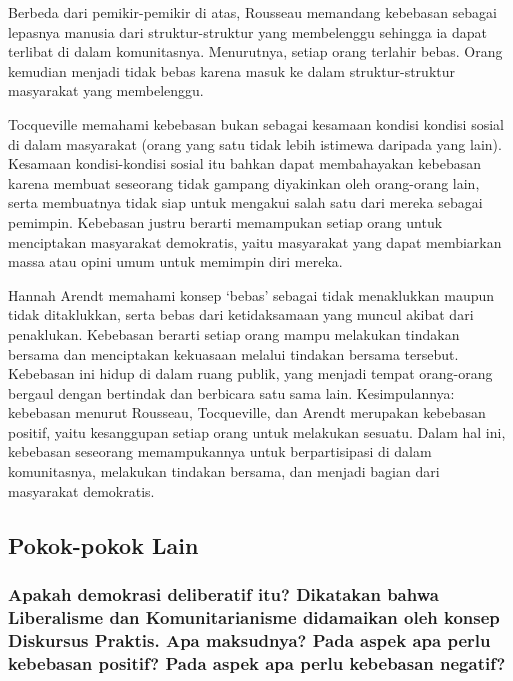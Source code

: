 \documentclass[11pt,twoside,a5paper,openany]{memoir}
\begin{document}
Berbeda dari pemikir-pemikir di atas, Rousseau memandang kebebasan
sebagai lepasnya manusia dari struktur-struktur yang membelenggu
sehingga ia dapat terlibat di dalam komunitasnya. Menurutnya, setiap
orang terlahir bebas. Orang kemudian menjadi tidak bebas karena masuk ke
dalam struktur-struktur masyarakat yang membelenggu.

Tocqueville memahami kebebasan bukan sebagai kesamaan kondisi kondisi
sosial di dalam masyarakat (orang yang satu tidak lebih istimewa
daripada yang lain). Kesamaan kondisi-kondisi sosial itu bahkan dapat
membahayakan kebebasan karena membuat seseorang tidak gampang diyakinkan
oleh orang-orang lain, serta membuatnya tidak siap untuk mengakui salah
satu dari mereka sebagai pemimpin. Kebebasan justru berarti memampukan
setiap orang untuk menciptakan masyarakat demokratis, yaitu masyarakat
yang dapat membiarkan massa atau opini umum untuk memimpin diri mereka.

Hannah Arendt memahami konsep `bebas' sebagai tidak menaklukkan maupun
tidak ditaklukkan, serta bebas dari ketidaksamaan yang muncul akibat
dari penaklukan. Kebebasan berarti setiap orang mampu melakukan tindakan
bersama dan menciptakan kekuasaan melalui tindakan bersama tersebut.
Kebebasan ini hidup di dalam ruang publik, yang menjadi tempat
orang-orang bergaul dengan bertindak dan berbicara satu sama lain.
Kesimpulannya: kebebasan menurut Rousseau, Tocqueville, dan Arendt
merupakan kebebasan positif, yaitu kesanggupan setiap orang untuk
melakukan sesuatu. Dalam hal ini, kebebasan seseorang memampukannya
untuk berpartisipasi di dalam komunitasnya, melakukan tindakan bersama,
dan menjadi bagian dari masyarakat demokratis.

\hypertarget{pokok-pokok-lain-4}{%
\subsection{Pokok-pokok Lain}\label{pokok-pokok-lain-4}}

\hypertarget{apakah-demokrasi-deliberatif-itu-dikatakan-bahwa-liberalisme-dan-komunitarianisme-didamaikan-oleh-konsep-diskursus-praktis.-apa-maksudnya-pada-aspek-apa-perlu-kebebasan-positif-pada-aspek-apa-perlu-kebebasan-negatif}{%
\subsubsection{Apakah demokrasi deliberatif itu? Dikatakan bahwa
Liberalisme dan Komunitarianisme didamaikan oleh konsep Diskursus
Praktis. Apa maksudnya? Pada aspek apa perlu kebebasan positif? Pada
aspek apa perlu kebebasan
negatif?}\label{apakah-demokrasi-deliberatif-itu-dikatakan-bahwa-liberalisme-dan-komunitarianisme-didamaikan-oleh-konsep-diskursus-praktis.-apa-maksudnya-pada-aspek-apa-perlu-kebebasan-positif-pada-aspek-apa-perlu-kebebasan-negatif}}
\end{document}
